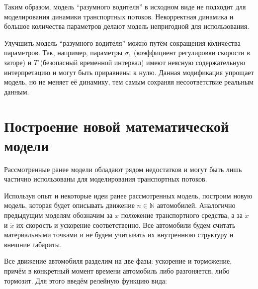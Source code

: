 \documentclass[12pt, a4paper]{extarticle}
\numberwithin{equation}{section}
\numberwithin{figure}{section}
\begin{document}
Таким образом, модель ``разумного водителя'' в исходном виде не подходит для моделирования динамики транспортных потоков. Некорректная динамика и большое количества параметров делают модель непригодной для использования.

Улучшить модель ``разумного водителя'' можно путём сокращения количества параметров. Так, например, параметры $\sigma_1$ (коэффициент регулировки скорости в заторе) и $T$ (безопасный временной интервал) имеют неясную содержательную интерпретацию и могут быть приравнены к нулю. Данная модификация упрощает модель, но не меняет её динамику, тем самым сохраняя несоответствие реальным данным.

\section{Построение новой математической модели}
Рассмотренные ранее модели обладают рядом недостатков и могут быть лишь частично использованы для моделирования транспортных потоков. 

Используя опыт и некоторые идеи ранее рассмотренных модель, построим новую модель, которая будет описывать движение $n \in \mathbb{N}$ автомобилей. Аналогично предыдущим моделям обозначим за $x$ положение транспортного средства, а за $\dot{x}$ и $\ddot{x}$ их скорость и ускорение соответственно. Все автомобили будем считать материальными точками и не будем учитывать их внутреннюю структуру и внешние габариты.

Все движение автомобиля разделим на две фазы: ускорение и торможение, причём в конкретный момент времени автомобиль либо разгоняется, либо тормозит. Для этого введём релейную функцию вида:
\end{document}
